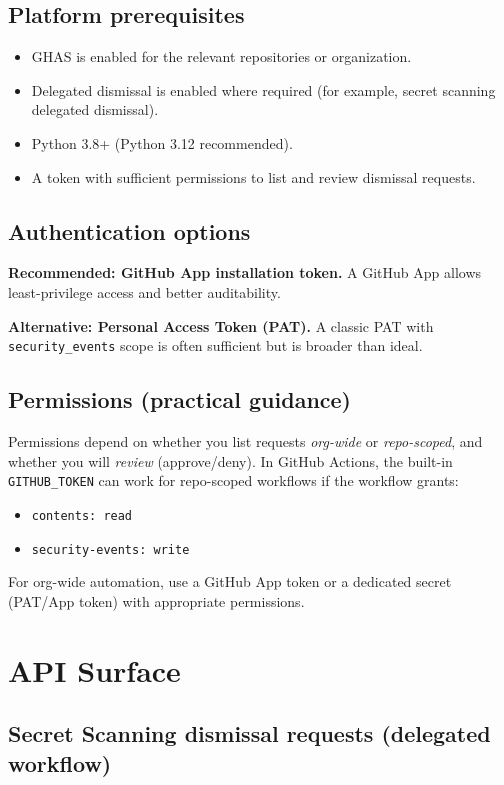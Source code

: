 \documentclass[11pt]{article}
\begin{document}
\subsection{Platform prerequisites}
\begin{itemize}
  \item GHAS is enabled for the relevant repositories or organization.
  \item Delegated dismissal is enabled where required (for example, secret scanning delegated dismissal).
  \item Python 3.8+ (Python 3.12 recommended).
  \item A token with sufficient permissions to list and review dismissal requests.
\end{itemize}

\subsection{Authentication options}

\textbf{Recommended: GitHub App installation token.}
A GitHub App allows least-privilege access and better auditability.

\textbf{Alternative: Personal Access Token (PAT).}
A classic PAT with \texttt{security\_events} scope is often sufficient but is broader than ideal.

\subsection{Permissions (practical guidance)}

Permissions depend on whether you list requests \emph{org-wide} or \emph{repo-scoped}, and whether you will \emph{review} (approve/deny).
In GitHub Actions, the built-in \texttt{GITHUB\_TOKEN} can work for repo-scoped workflows if the workflow grants:
\begin{itemize}
  \item \texttt{contents: read}
  \item \texttt{security-events: write}
\end{itemize}

For org-wide automation, use a GitHub App token or a dedicated secret (PAT/App token) with appropriate permissions.

\section{API Surface}

\subsection{Secret Scanning dismissal requests (delegated workflow)}
\end{document}
